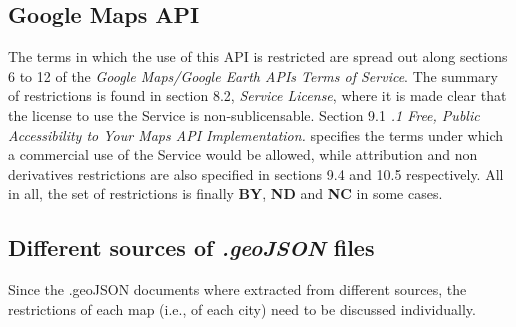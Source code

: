 \subsection{Google Maps API}

The terms in which the use of this API is restricted are spread out along sections 6 to 12 of the \textit{Google Maps/Google Earth APIs Terms of Service}. The summary of restrictions is found in section 8.2, \textit{Service License}, where it is made clear that the license to use the Service is non-sublicensable. Section 9.1 \textit{.1 Free, Public Accessibility to Your Maps API Implementation.} specifies the terms under which a commercial use of the Service would be allowed, while attribution and non derivatives restrictions are also specified in sections 9.4 and 10.5 respectively. All in all, the set of restrictions is finally  \textbf{BY}, \textbf{ND} and \textbf{NC} in some cases.

\subsection{Different sources of \textit{.geoJSON} files}

Since the .geoJSON documents where extracted from different sources, the restrictions of each map (i.e., of each city) need to be discussed individually. 

